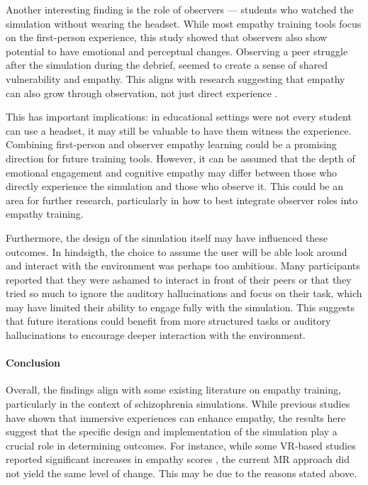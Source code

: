 Another interesting finding is the role of observers — students who watched the simulation without wearing the headset. While most empathy training tools focus on the first-person experience, this study showed that observers also show potential to have  emotional and perceptual changes. Observing a peer struggle after the simulation during the debrief, seemed to create a sense of shared vulnerability and empathy. This aligns with research suggesting that empathy can also grow through observation, not just direct experience \cite{Formosa2018}.
\vspace{1em}

This has important implications: in educational settings were not every student can use a headset, it may still be valuable to have them witness the experience. Combining first-person and observer empathy learning could be a promising direction for future training tools. However, it can be assumed that the depth of emotional engagement and cognitive empathy may differ between those who directly experience the simulation and those who observe it. This could be an area for further research, particularly in how to best integrate observer roles into empathy training. 

\vspace{1em}

Furthermore, the design of the simulation itself may have influenced these outcomes. In hindsigth, the choice to assume the user will be able look around and interact with the environment was perhaps too ambitious. Many participants reported that they were ashamed to interact in front of their peers or that they tried so much to ignore the auditory hallucinations and focus on their task, which may have limited their ability to engage fully with the simulation. This suggests that future iterations could benefit from more structured tasks or auditory hallucinations to encourage deeper interaction with the environment.


\paragraph{Conclusion}
Overall, the findings align with some existing literature on empathy training, particularly in the context of schizophrenia simulations. While previous studies have shown that immersive experiences can enhance empathy, the results here suggest that the specific design and implementation of the simulation play a crucial role in determining outcomes. For instance, while some VR-based studies reported significant increases in empathy scores \cite{Martingano2021, Ventura2020}, the current MR approach did not yield the same level of change. This may be due to the reasons stated above.

